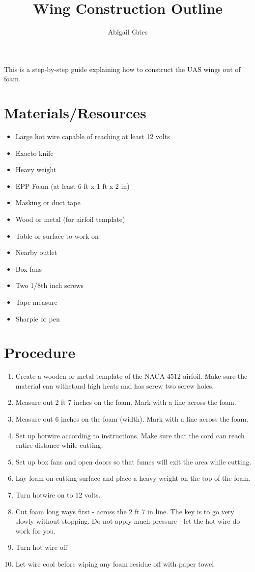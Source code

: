 \documentclass{article}
\begin{document}
\title{\textbf{Wing Construction Outline}}
\author{Abigail Gries}
\maketitle

This is a step-by-step guide explaining how to construct the UAS wings out of foam. \\


\section*{Materials/Resources}

\begin{itemize}
	\item Large hot wire capable of reaching at least 12 volts
	\item Exacto knife
	\item Heavy weight
	\item EPP Foam (at least 6 ft x 1 ft x 2 in)
	\item Masking or duct tape
	\item Wood or metal (for airfoil template)
	\item Table or surface to work on 
	\item Nearby outlet
	\item Box fans
	\item Two 1/8th inch screws
	\item Tape measure
	\item Sharpie or pen

	
\end{itemize}

\section*{Procedure}
\begin{enumerate}
	\item Create a wooden or metal template of the NACA 4512 airfoil. Make sure the material can withstand high heats and has screw two screw holes.
	\item Measure out 2 ft 7 inches on the foam. Mark with a line across the foam.
	\item Measure out 6 inches on the foam (width). Mark with a line across the foam.
	\item Set up hotwire according to instructions. Make sure that the cord can reach entire distance while cutting. 
	\item Set up box fans and open doors so that fumes will exit the area while cutting.
	\item Lay foam on cutting surface and place a heavy weight on the top of the foam.
	\item Turn hotwire on to 12 volts.
	\item Cut foam long ways first - across the 2 ft 7 in line. The key is to go very slowly without stopping. Do not apply much pressure - let the hot wire do 					work for you.
	\item Turn hot wire off
	\item Let wire cool before wiping any foam residue off with paper towel

\end{enumerate}
\end{document}
